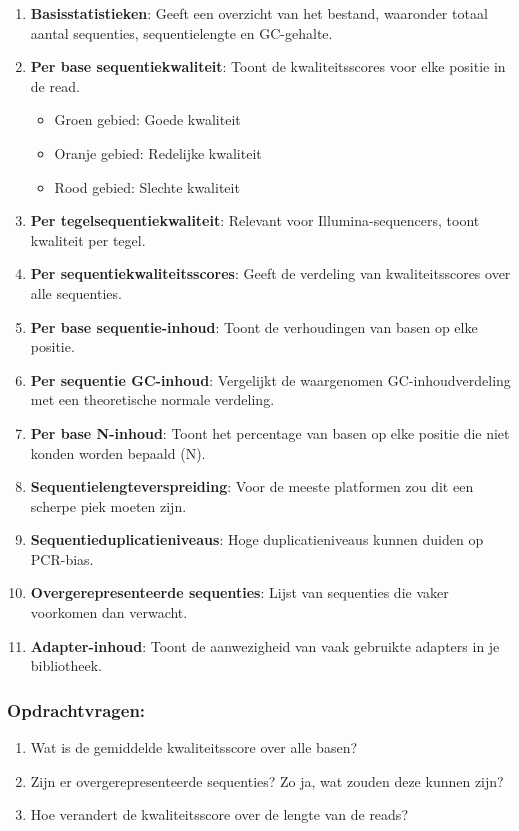 \documentclass[
  letterpaper,
  DIV=11,
  numbers=noendperiod]{scrartcl}
\providecommand{\tightlist}{%
  \setlength{\itemsep}{0pt}\setlength{\parskip}{0pt}}\usepackage{longtable,booktabs,array}
\begin{document}
\begin{enumerate}
\def\labelenumi{\arabic{enumi}.}
\item
  \textbf{Basisstatistieken}: Geeft een overzicht van het bestand,
  waaronder totaal aantal sequenties, sequentielengte en GC-gehalte.
\item
  \textbf{Per base sequentiekwaliteit}: Toont de kwaliteitsscores voor
  elke positie in de read.

  \begin{itemize}
  \tightlist
  \item
    Groen gebied: Goede kwaliteit
  \item
    Oranje gebied: Redelijke kwaliteit
  \item
    Rood gebied: Slechte kwaliteit
  \end{itemize}
\item
  \textbf{Per tegelsequentiekwaliteit}: Relevant voor
  Illumina-sequencers, toont kwaliteit per tegel.
\item
  \textbf{Per sequentiekwaliteitsscores}: Geeft de verdeling van
  kwaliteitsscores over alle sequenties.
\item
  \textbf{Per base sequentie-inhoud}: Toont de verhoudingen van basen op
  elke positie.
\item
  \textbf{Per sequentie GC-inhoud}: Vergelijkt de waargenomen
  GC-inhoudverdeling met een theoretische normale verdeling.
\item
  \textbf{Per base N-inhoud}: Toont het percentage van basen op elke
  positie die niet konden worden bepaald (N).
\item
  \textbf{Sequentielengteverspreiding}: Voor de meeste platformen zou
  dit een scherpe piek moeten zijn.
\item
  \textbf{Sequentieduplicatieniveaus}: Hoge duplicatieniveaus kunnen
  duiden op PCR-bias.
\item
  \textbf{Overgerepresenteerde sequenties}: Lijst van sequenties die
  vaker voorkomen dan verwacht.
\item
  \textbf{Adapter-inhoud}: Toont de aanwezigheid van vaak gebruikte
  adapters in je bibliotheek.
\end{enumerate}

\subsubsection{Opdrachtvragen:}\label{opdrachtvragen}

\begin{enumerate}
\def\labelenumi{\arabic{enumi}.}
\tightlist
\item
  Wat is de gemiddelde kwaliteitsscore over alle basen?
\item
  Zijn er overgerepresenteerde sequenties? Zo ja, wat zouden deze kunnen
  zijn?
\item
  Hoe verandert de kwaliteitsscore over de lengte van de reads?
\end{enumerate}
\end{document}
